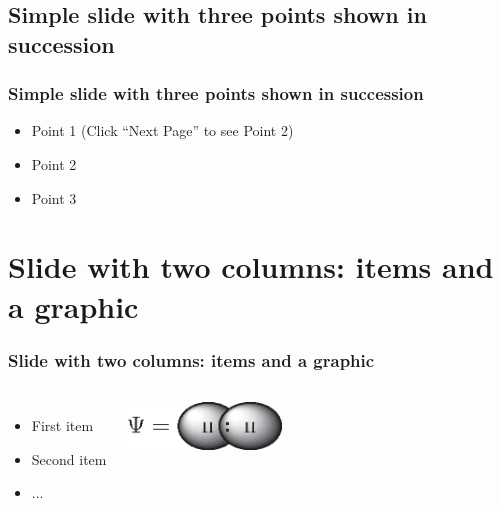 \documentclass[]{beamer}
\begin{document}
\subsection{Simple slide with three points shown in succession}

\begin{frame}
  \frametitle{Simple slide with three points shown in succession}   %

  \begin{itemize}
  \item<1-> Point 1 (Click ``Next Page'' to see Point 2) %
  \item<2-> Point 2  %
  \item<3-> Point 3
  \end{itemize}
\end{frame}

\section{Slide with two columns: items and a graphic}
\begin{frame}
  \frametitle{Slide with two columns: items and a graphic}   %
  \begin{columns}[c]
  \column{2in}  %
  \begin{itemize}
  \item<1-> First item
  \item<2-> Second item
  \item<3-> ...
  \end{itemize}
  \column{2in}
  \includegraphics[height=0.5in]{figures/coulson.eps}
  \end{columns}
\end{frame}
\end{document}
